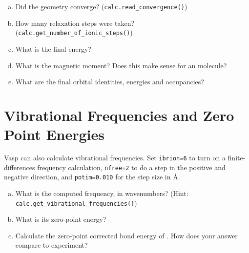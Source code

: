 \documentclass[11pt]{article}
\begin{document}
\begin{enumerate}[(a)]
\item Did the geometry converge? (\texttt{calc.read\_convergence()})

\item How many relaxation steps were taken? (\texttt{calc.get\_number\_of\_ionic\_steps()})

\item What is the final  energy?

\item What is the magnetic moment? Does this make sense for an  molecule?

\item What are the final orbital identities, energies and occupancies?
\end{enumerate}

\section{Vibrational Frequencies and Zero Point Energies}
\label{sec:orgf15662e}
Vasp can also calculate vibrational frequencies. Set \texttt{ibrion=6} to turn on a finite-differences frequency calculation, \texttt{nfree=2} to do a step in the positive and negative direction, and \texttt{potim=0.010} for the step size in \AA{}.

\begin{enumerate}[(a)]
\item What is the computed  frequency, in wavenumbers? (Hint: \texttt{calc.get\_vibrational\_frequencies()})

\item What is its zero-point energy?

\item Calculate the zero-point corrected bond energy of . How does your answer compare to experiment?
\end{enumerate}
\end{document}
